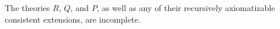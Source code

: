 The theories $R$, $Q$, and $P$, as well as any of their recursively axiomatizable consistent extensions, are incomplete.
